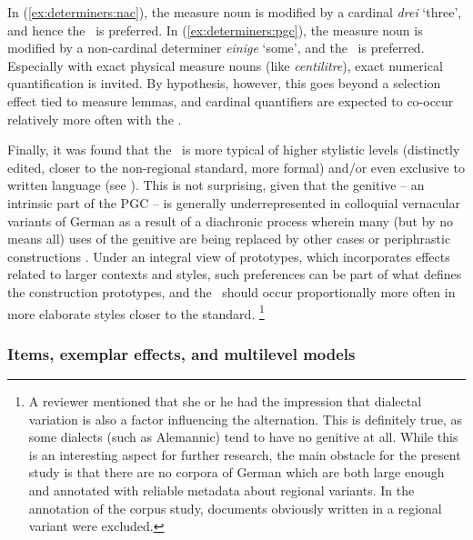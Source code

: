 In (\ref{ex:determiners:nac}), the measure noun is modified by a cardinal \textit{drei} `three', and hence the \NACa\ is preferred.
In (\ref{ex:determiners:pgc}), the measure noun is modified by a non-cardinal determiner \textit{einige} `some', and the \PGCa\ is preferred.
Especially with exact physical measure nouns (like \textit{centilitre}), exact numerical quantification is invited.
By hypothesis, however, this goes beyond a selection effect tied to measure lemmas, and cardinal quantifiers are expected to co-occur relatively more often with the \NACa.

Finally, it was found that the \PGCa\ is more typical of higher stylistic levels (distinctly edited, closer to the non-regional standard, more formal) and\slash or even exclusive to written language (see \citealp[320--323]{Hentschel1993}).
This is not surprising, given that the genitive -- an intrinsic part of the PGC -- is generally underrepresented in colloquial vernacular variants of German as a result of a diachronic process wherein many (but by no means all) uses of the genitive are being replaced by other cases or periphrastic constructions \citep{FleischerSchallert2011}.
Under an integral view of prototypes, which incorporates effects related to larger contexts and styles, such preferences can be part of what defines the construction prototypes, and the \PGCa\ should occur proportionally more often in more elaborate styles closer to the standard.%
\footnote{A reviewer mentioned that she or he had the impression that dialectal variation is also a factor influencing the alternation.
This is definitely true, as some dialects (such as Alemannic) tend to have no genitive at all.
While this is an interesting aspect for further research, the main obstacle for the present study is that there are no corpora of German which are both large enough and annotated with reliable metadata about regional variants.
In the annotation of the corpus study, documents obviously written in a regional variant were excluded.}

\subsubsection{Items, exemplar effects, and multilevel models}
\label{sec:itemandexemplareffects}

